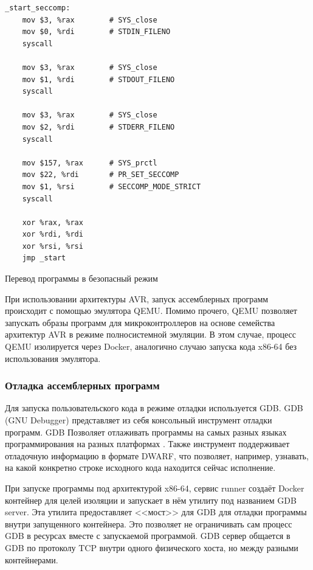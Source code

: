 \documentclass[a4paper,article,14pt]{extarticle}
\begin{document}
\begin{listing}[ht]
\begin{verbatim}
_start_seccomp:
    mov $3, %rax        # SYS_close
    mov $0, %rdi        # STDIN_FILENO
    syscall

    mov $3, %rax        # SYS_close
    mov $1, %rdi        # STDOUT_FILENO
    syscall

    mov $3, %rax        # SYS_close
    mov $2, %rdi        # STDERR_FILENO
    syscall

    mov $157, %rax      # SYS_prctl
    mov $22, %rdi       # PR_SET_SECCOMP
    mov $1, %rsi        # SECCOMP_MODE_STRICT
    syscall

    xor %rax, %rax
    xor %rdi, %rdi
    xor %rsi, %rsi
    jmp _start
\end{verbatim}
\caption{Перевод программы в безопасный режим}
\label{lst:seccomp}
\end{listing}

При использовании архитектуры AVR, запуск ассемблерных программ происходит с помощью эмулятора QEMU. Помимо прочего, QEMU позволяет запускать образы программ для микроконтроллеров на основе семейства архитектур AVR в режиме полносистемной эмуляции. В этом случае, процесс QEMU изолируется через Docker, аналогично случаю запуска кода x86-64 без использования эмулятора.

\subsubsection{Отладка ассемблерных программ}

Для запуска пользовательского кода в режиме отладки используется GDB. GDB (GNU Debugger) представляет из себя консольный инструмент отладки программ. GDB Позволяет отлаживать программы на самых разных языках программирования на разных платформах \cite{gdb}. Также инструмент поддерживает отладочную информацию в формате DWARF, что позволяет, например, узнавать, на какой конкретно строке исходного кода находится сейчас исполнение.

При запуске программы под архитектурой x86-64, сервис runner создаёт Docker контейнер для целей изоляции и запускает в нём утилиту под названием GDB server. Эта утилита предоставляет <<мост>> для GDB для отладки программы внутри запущенного контейнера. Это позволяет не ограничивать сам процесс GDB в ресурсах вместе с запускаемой программой. GDB сервер общается в GDB по протоколу TCP внутри одного физического хоста, но между разными контейнерами.
\end{document}
